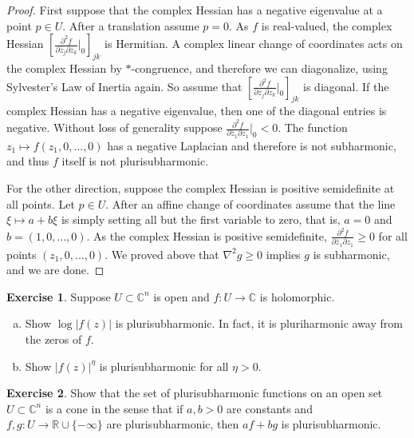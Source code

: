 \documentclass[12pt,openany]{book}
\newcommand{\sabs}[1]{\lvert {#1} \rvert}
\newcommand{\C}{{\mathbb{C}}}
\newcommand{\R}{{\mathbb{R}}}
\theoremstyle{plain}
\theoremstyle{remark}
\theoremstyle{definition}
\newenvironment{exbox}{%
    \def\FrameCommand{\vrule width 1pt \relax\hspace{10pt}}%
    \MakeFramed{\advance\hsize-\width\FrameRestore}%
}{%
    \endMakeFramed
}
\newenvironment{exparts}{%
    \leavevmode\begin{enumerate}[a),noitemsep,topsep=0pt,parsep=0pt,partopsep=0pt]
}{%
    \end{enumerate}
}
\theoremstyle{exercise}
\newtheorem{exercise}{Exercise}[section]
\theoremstyle{example}
\begin{document}
\begin{proof}
First suppose that the complex Hessian has a negative eigenvalue at
a point $p \in U$.
After a translation assume $p=0$.
As $f$ is real-valued, the complex Hessian
$\left[
\frac{\partial^2 f}{\partial \bar{z}_j \partial z_k}
\Big|_0
\right]_{jk}$ is Hermitian.  A complex linear change of coordinates
acts on the complex Hessian by $*$-congruence, and therefore we can
diagonalize,
using Sylvester's Law of Inertia again.
So assume that 
$\left[
\frac{\partial^2 f}{\partial \bar{z}_j \partial z_k}
\Big|_0
\right]_{jk}$ is diagonal.  If the complex Hessian has a negative eigenvalue, then
one of the diagonal entries is negative.
Without loss of generality suppose
$\frac{\partial^2 f}{\partial \bar{z}_1 \partial z_1}\Big|_0 < 0$.
The function $z_1 \mapsto f(z_1,0,\ldots,0)$ has
a negative Laplacian and therefore is not subharmonic, and thus $f$ itself
is not plurisubharmonic.

For the other direction, suppose the complex Hessian is positive
semidefinite at all points.
Let $p \in U$.  After an affine change of coordinates assume that the
line $\xi \mapsto a+b\xi$ is simply setting all but the first variable to
zero, that is, $a=0$ and $b=(1,0,\ldots,0)$.
As the complex Hessian is positive semidefinite,
$\frac{\partial^2 f}{\partial \bar{z}_1 \partial z_1} \geq 0$ for all
points $(z_1,0,\ldots,0)$.  We proved above that $\nabla^2 g \geq 0$
implies $g$ is subharmonic, and we are done.
\end{proof}

\begin{exbox}
\begin{exercise} \label{exercise:modholplush}
Suppose $U \subset \C^n$ is open and $f \colon U \to \C$ is holomorphic.
\begin{exparts}
\item
Show $\log \sabs{f(z)}$ is plurisubharmonic.  In fact, it is pluriharmonic away from the zeros of $f$.
\item
Show $\sabs{f(z)}^{\eta}$ is plurisubharmonic for all $\eta > 0$.
\end{exparts}
\end{exercise}

\begin{exercise}
Show that the set of plurisubharmonic functions on an open set $U \subset \C^n$
is a cone in the sense that if $a,b > 0$ are constants and
$f, g \colon U \to \R \cup \{ -\infty \}$ are plurisubharmonic, then
$a f + b g$ is plurisubharmonic.
\end{exercise}
\end{exbox}
\end{document}

